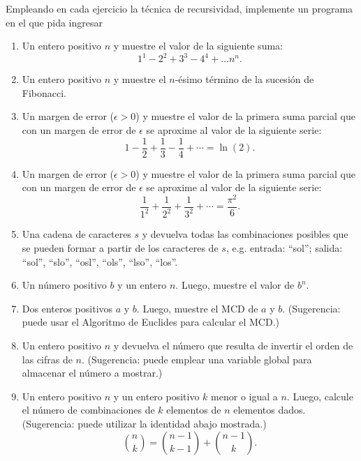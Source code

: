 \documentclass[10pt,a4paper]{article}
\newcounter{num}
\begin{document}
Empleando en cada ejercicio la t\'ecnica de recursividad, implemente un programa en el que pida ingresar
\begin{enumerate}
\item Un entero positivo $n$ y muestre el valor de la siguiente suma: $$ 1^1 - 2^2 + 3^3 - 4^4 + \ldots n^n. $$
\item Un entero positivo $n$ y muestre el $n$-\'esimo t\'ermino de la sucesi\'on de Fibonacci.
\item Un margen de error ($\epsilon > 0$) y muestre el valor de la primera suma parcial que con un margen de error de $\epsilon$ se aproxime al valor de la siguiente serie: 
$$1 - \frac{1}{2} + \frac{1}{3} - \frac{1}{4} + \cdots = \ln(2).$$
\item Un margen de error ($\epsilon > 0$) y muestre el valor de la primera suma parcial que con un margen de error de $\epsilon$ se aproxime al valor de la siguiente serie: 
$$\frac{1}{1^2} + \frac{1}{2^2} + \frac{1}{3^2} + \cdots = \frac{{\pi}^2}{6}.$$
\item Una cadena de caracteres $s$ y devuelva todas las combinaciones posibles que se pueden formar a partir de los caracteres de $s$, e.g. entrada: ``sol''; salida: ``sol'', ``slo'', ``osl'', ``ols'', ``lso'', ``los''.
\item Un n\'umero positivo $b$ y un entero $n$. Luego, muestre el valor de $b^n$.
\item Dos enteros positivos $a$ y $b$. Luego, muestre el MCD de $a$ y $b$. (Sugerencia: puede usar el Algoritmo de Euclides para calcular el MCD.)
\item Un entero positivo $n$ y devuelva el n\'umero que resulta de invertir el orden de las cifras de $n$. (Sugerencia: puede emplear una variable global para almacenar el n\'umero a mostrar.)
\item Un entero positivo $n$ y un entero positivo $k$ menor o igual a $n$. Luego, calcule el n\'umero de combinaciones de $k$ elementos de $n$ elementos dados. (Sugerencia: puede utilizar la identidad abajo mostrada.) $$\binom nk = \binom{n-1}{k-1} + \binom{n-1}k.$$   

\end{enumerate}
\end{document}
